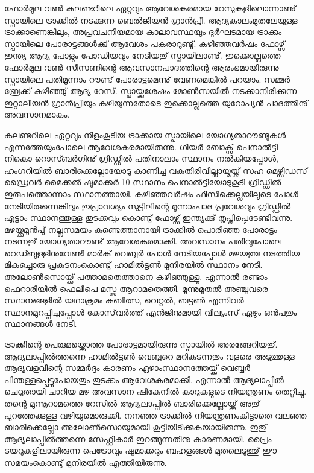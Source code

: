 ﻿
\vskip 2pt

ഫോര്‍മുല വണ്‍ കലണ്ടറിലെ ഏറ്റവും ആവേശകരമായ റേസുകളിലൊന്നാണു് സ്പായിലെ ട്രാക്കില്‍ നടക്കുന്ന 
ബെല്‍ജിയന്‍ ഗ്രാന്‍പ്രീ. ആദ്യകാലംമുതലേയുള്ള ട്രാക്കാണെങ്കിലും, അപ്രവചനീയമായ കാലാവസ്ഥയും ദുര്‍ഘടമായ 
ട്രാക്കും സ്പായിലെ പോരാട്ടങ്ങള്‍ക്കു് ആവേശം പകരാറുണ്ടു്. കഴിഞ്ഞവര്‍ഷം ഫോഴ്സ് ഇന്ത്യ ആദ്യ പോളും പോഡിയവും 
നേടിയതു് സ്പായിലാണു്. ഇക്കൊല്ലത്തെ ഫോര്‍മുല വണ്‍ സീസണിന്റെ ആവസാനപാദത്തിന്റെ ആരംഭമായിരുന്നു 
സ്പായിലെ പതിമൂന്നാം റൗണ്ട് പോരാട്ടമെന്നു് വേണമെങ്കില്‍ പറയാം. സമ്മര്‍ ബ്രേക്ക് കഴിഞ്ഞു് ആദ്യ റേസ്. 
സ്പായ്ക്കുശേഷം മോണ്‍സയില്‍ നടക്കാനിരിക്കുന്ന ഇറ്റാലിയന്‍ ഗ്രാന്‍പ്രിയും കഴിയുന്നതോടെ ഇക്കൊല്ലത്തെ യുറോപ്യന്‍ 
പാദത്തിനു് അവസാനമാകും.

കലണ്ടറിലെ ഏറ്റവും നീളംകൂടിയ ട്രാക്കായ സ്പായിലെ യോഗ്യതാറൗണ്ടുകള്‍ എന്നത്തേയുംപോലെ 
ആവേശകരമായിരുന്നു. ഗിയര്‍ ബോക്സ് പെനാല്‍ട്ടി നികൊ റൊസ്ബര്‍ഗിനു് ഗ്രിഡ്ഡില്‍ പതിനാലാം സ്ഥാനം 
നല്‍കിയപ്പോള്‍, ഹംഗറിയില്‍ ബാരിക്കെല്ലോയോടു കാണിച്ച വകതിരിവില്ലായ്മയ്ക്കു് സഹ മെഴ്സിഡസ് ഡ്രൈവര്‍ മൈക്കല്‍ 
ഷുമാക്കര്‍ 10 സ്ഥാനം പെനാല്‍ട്ടിയോടുകൂടി ഗ്രിഡ്ഡില്‍ ഇരുപത്തൊന്നാം സ്ഥാനത്തായി. കഴിഞ്ഞവര്‍ഷം ഫിസിക്കെല്ലയിലൂടെ 
പോള്‍ നേടിയിരുന്നെങ്കിലും ഇപ്രാവശ്യം സുട്ടിലിന്റെ മൂന്നാംപാദ പ്രവേശവും ഗ്രിഡ്ഡില്‍ എട്ടാം സ്ഥാനത്തുള്ള തുടക്കവും 
കൊണ്ടു് ഫോഴ്സ് ഇന്ത്യക്കു് തൃപ്തിപ്പെടേണ്ടിവന്നു. മഴയ്ക്കുമുന്‍പു് നല്ലസമയം കണ്ടെത്താനായി ട്രാക്കില്‍ പൊരിഞ്ഞ പോരാട്ടം 
നടന്നതു് യോഗ്യതാറൗണ്ട് ആവേശകരമാക്കി. അവസാനം പതിവുപോലെ റെഡ്ബുള്ളിനുവേണ്ടി മാര്‍ക് വെബ്ബര്‍ 
പോള്‍ നേടിയപ്പോള്‍ മഴയത്തു നടത്തിയ മികച്ചൊരു പ്രകടനംകൊണ്ടു് ഹാമില്‍ട്ടണ്‍ മുനിരയില്‍ സ്ഥാനം നേടി. 
അലോണ്‍സൊയ്ക്ക് പത്താമതെത്താനെ കഴിഞ്ഞുള്ളൂ. എന്നാല്‍ രണ്ടാം ഫെറാരിയില്‍ ഫെലിപെ മസ്സ ആറാമതെത്തി. 
മൂന്നുമുതല്‍ അഞ്ചുവരെ സ്ഥാനങ്ങളില്‍ യഥാക്രമം കുബിത്സ, വെറ്റല്‍, ബട്ടണ്‍ എന്നിവര്‍ സ്ഥാനമുറപ്പിച്ചപ്പോള്‍ 
കോസ്‌വര്‍ത്ത് എന്‍ജിനുമായി വില്യംസ് ഏഴും ഒന്‍പതും സ്ഥാനങ്ങള്‍ നേടി.

ട്രാക്കിന്റെ പെരുമയ്ക്കൊത്ത പോരാട്ടമായിരുന്നു സ്പായില്‍ അരങ്ങേറിയതു്. ആദ്യലാപ്പില്‍ത്തന്നെ ഹാമില്‍ട്ടണ്‍ വെബ്ബറെ 
മറികടന്നതും വളരെ അടുത്തുള്ള ആദ്യവളവിന്റെ സമ്മര്‍ദ്ദം കാരണം ഏഴാംസ്ഥാനത്തേയ്ക്ക് വെബ്ബര്‍ 
പിന്തള്ളപ്പെട്ടുപോയതും തുടക്കം ആവേശകരമാക്കി. എന്നാല്‍ ആദ്യലാപ്പില്‍ ചെറുതായി ചാറിയ മഴ അവസാന 
ഷികേനില്‍ കാറുകളുടെ നിയന്ത്രണം തെറ്റിച്ചു. തന്റെ മുന്നൂറാമത്തെ റേസില്‍ ആദ്യലാപ്പില്‍ ബാരിക്കെല്ലോയ്ക്കു് അതു് 
പുറത്തേക്കുള്ള വഴിയുമൊരുക്കി. നനഞ്ഞ ട്രാക്കില്‍ നിയന്ത്രണംകിട്ടാതെ വലഞ്ഞ ബാരിക്കെല്ലോ അലോണ്‍സൊയുമായി 
കൂട്ടിയിടിക്കുകയായിരുന്നു. ഇതു് ആദ്യലാപ്പില്‍ത്തന്നെ സേഫ്റ്റികാര്‍ ഇറങ്ങുന്നതിനു കാരണമായി. പ്രൈം 
ടയറുകളിലായിരുന്ന പെട്രോവും ഷുമാക്കറും ബഹളങ്ങള്‍ മുതലെടുത്തു് ഈ സമയംകൊണ്ടു് മുനിരയില്‍ 
എത്തിയിരുന്നു.

